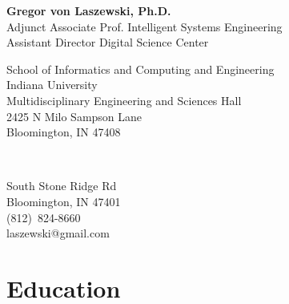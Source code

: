 \documentclass{article}
\begin{document}
\setcounter{varseg}{0}

\begin{center}
  {\huge\bf Gregor von Laszewski, Ph.D.} \\
Adjunct Associate Prof. Intelligent Systems Engineering\\
Assistant Director Digital Science Center\\

\end{center}

\begin{minipage}[t]{0.6\columnwidth}

School of Informatics and Computing and Engineering\\
Indiana University\\
Multidisciplinary Engineering and Sciences Hall\\
2425 N Milo Sampson Lane\\
Bloomington, IN  47408\\
\end{minipage}
\ \
\begin{minipage}[t]{0.4\columnwidth}
 South Stone Ridge Rd\\
Bloomington, IN 47401\\
(812)~824-8660\\
laszewski@gmail.com\\
\end{minipage}



\section{Education}
\end{document}
